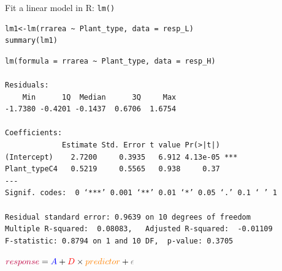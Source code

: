 \documentclass[10pt]{beamer}
\makeatletter
\newenvironment{kframe}{%
 \def\at@end@of@kframe{}%
 \ifinner\ifhmode%
  \def\at@end@of@kframe{\end{minipage}}%
  \begin{minipage}{\columnwidth}%
 \fi\fi%
 \def\FrameCommand##1{\hskip\@totalleftmargin \hskip-\fboxsep
 \colorbox{shadecolor}{##1}\hskip-\fboxsep
     \hskip-\linewidth \hskip-\@totalleftmargin \hskip\columnwidth}%
 \MakeFramed {\advance\hsize-\width
   \@totalleftmargin\z@ \linewidth\hsize
   \@setminipage}}%
 {\par\unskip\endMakeFramed%
 \at@end@of@kframe}
\newenvironment{knitrout}{}{} %
\makeatother
\begin{document}
\begin{frame}[fragile]{Fit a linear model in R: \texttt{lm()}}

\begin{knitrout}
\color{fgcolor}\begin{kframe}
\begin{verbatim}
lm1<-lm(rrarea ~ Plant_type, data = resp_L)
summary(lm1)
\end{verbatim}
\end{kframe}
\end{knitrout}

\vspace{-0.15cm}
\pause
\begin{knitrout}
\color{fgcolor}\begin{kframe}
\footnotesize
\begin{verbatim}
lm(formula = rrarea ~ Plant_type, data = resp_H)

Residuals:
    Min      1Q  Median      3Q     Max 
-1.7380 -0.4201 -0.1437  0.6706  1.6754 

Coefficients:
             Estimate Std. Error t value Pr(>|t|)    
(Intercept)    2.7200     0.3935   6.912 4.13e-05 ***
Plant_typeC4   0.5219     0.5565   0.938     0.37    
---
Signif. codes:  0 ‘***’ 0.001 ‘**’ 0.01 ‘*’ 0.05 ‘.’ 0.1 ‘ ’ 1

Residual standard error: 0.9639 on 10 degrees of freedom
Multiple R-squared:  0.08083,	Adjusted R-squared:  -0.01109 
F-statistic: 0.8794 on 1 and 10 DF,  p-value: 0.3705
\end{verbatim}
\end{kframe}
\end{knitrout}

\pause
${\color{purple}{response}} = {\color{blue}{A}} + {\color{red}{D}} \times {\color{orange}{predictor}} + {\color{gray}{\epsilon}}$

\end{frame}
\end{document}
